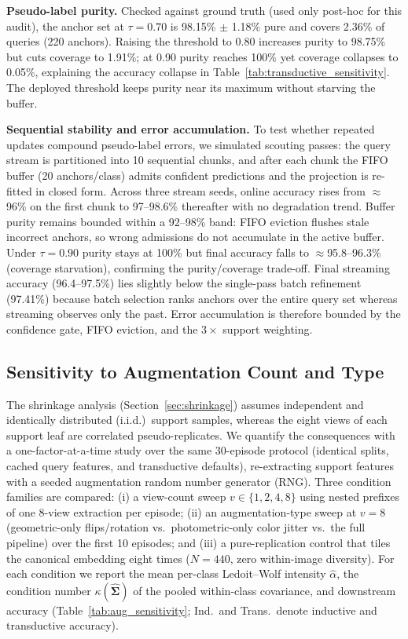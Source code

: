 \textbf{Pseudo-label purity.} Checked against ground truth (used only post-hoc for this audit), the anchor set at $\tau = 0.70$ is 98.15\% $\pm$ 1.18\% pure and covers 2.36\% of queries (220 anchors). Raising the threshold to 0.80 increases purity to 98.75\% but cuts coverage to 1.91\%; at 0.90 purity reaches 100\% yet coverage collapses to 0.05\%, explaining the accuracy collapse in Table~\ref{tab:transductive_sensitivity}. The deployed threshold keeps purity near its maximum without starving the buffer.

\textbf{Sequential stability and error accumulation.} To test whether repeated updates compound pseudo-label errors, we simulated scouting passes: the query stream is partitioned into 10 sequential chunks, and after each chunk the FIFO buffer (20 anchors/class) admits confident predictions and the projection is re-fitted in closed form. Across three stream seeds, online accuracy rises from $\approx$96\% on the first chunk to 97--98.6\% thereafter with no degradation trend. Buffer purity remains bounded within a 92--98\% band: FIFO eviction flushes stale incorrect anchors, so wrong admissions do not accumulate in the active buffer. Under $\tau = 0.90$ purity stays at 100\% but final accuracy falls to $\approx$95.8--96.3\% (coverage starvation), confirming the purity/coverage trade-off. Final streaming accuracy (96.4--97.5\%) lies slightly below the single-pass batch refinement (97.41\%) because batch selection ranks anchors over the entire query set whereas streaming observes only the past. Error accumulation is therefore bounded by the confidence gate, FIFO eviction, and the $3\times$ support weighting.

\subsection{Sensitivity to Augmentation Count and Type}
\label{sec:aug_sensitivity}
The shrinkage analysis (Section~\ref{sec:shrinkage}) assumes independent and identically distributed (i.i.d.)\ support samples, whereas the eight views of each support leaf are correlated pseudo-replicates. We quantify the consequences with a one-factor-at-a-time study over the same 30-episode protocol (identical splits, cached query features, and transductive defaults), re-extracting support features with a seeded augmentation random number generator (RNG). Three condition families are compared: (i) a view-count sweep $v\in\{1,2,4,8\}$ using nested prefixes of one 8-view extraction per episode; (ii) an augmentation-type sweep at $v=8$ (geometric-only flips/rotation vs.\ photometric-only color jitter vs.\ the full pipeline) over the first 10 episodes; and (iii) a pure-replication control that tiles the canonical embedding eight times ($N=440$, zero within-image diversity). For each condition we report the mean per-class Ledoit--Wolf intensity $\hat{\alpha}$, the condition number $\kappa(\hat{\mathbf{\Sigma}})$ of the pooled within-class covariance, and downstream accuracy (Table~\ref{tab:aug_sensitivity}; Ind.\ and Trans.\ denote inductive and transductive accuracy).

